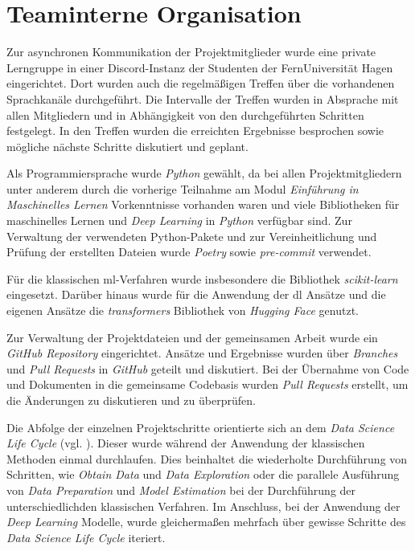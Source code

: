 \section{Teaminterne Organisation}\label{sec:teaminterneorganisation}

Zur asynchronen Kommunikation der Projektmitglieder wurde eine private Lerngruppe in einer Discord-Instanz der Studenten der FernUniversität Hagen eingerichtet.
Dort wurden auch die regelmäßigen Treffen über die vorhandenen Sprachkanäle durchgeführt.
Die Intervalle der Treffen wurden in Absprache mit allen Mitgliedern und in Abhängigkeit von den durchgeführten Schritten festgelegt.
In den Treffen wurden die erreichten Ergebnisse besprochen sowie mögliche nächste Schritte diskutiert und geplant.

Als Programmiersprache wurde \textit{Python} gewählt, da bei allen Projektmitgliedern unter anderem durch die vorherige Teilnahme am Modul \textit{Einführung in Maschinelles Lernen} Vorkenntnisse vorhanden waren und viele Bibliotheken für maschinelles Lernen und \textit{Deep Learning} in \textit{Python} verfügbar sind.
Zur Verwaltung der verwendeten Python-Pakete und zur Vereinheitlichung und Prüfung der erstellten Dateien wurde \textit{Poetry} \cite{poetry2025} sowie \textit{pre-commit}\cite{precommit2025} verwendet.

Für die klassischen \gls{ml}-Verfahren wurde insbesondere die Bibliothek \textit{scikit-learn} eingesetzt.
Darüber hinaus wurde für die Anwendung der \gls{dl} Ansätze und die eigenen Ansätze die \textit{transformers} Bibliothek von \textit{Hugging Face} genutzt.

Zur Verwaltung der Projektdateien und der gemeinsamen Arbeit wurde ein \textit{GitHub Repository} \cite{githubrepo2025} eingerichtet.
Ansätze und Ergebnisse wurden über \textit{Branches} und \textit{Pull Requests} in \textit{GitHub} geteilt und diskutiert.
Bei der Übernahme von Code und Dokumenten in die gemeinsame Codebasis wurden \textit{Pull Requests} erstellt, um die Änderungen zu diskutieren und zu überprüfen.

Die Abfolge der einzelnen Projektschritte orientierte sich an dem \textit{Data Science Life Cycle} (vgl. \cite[Abb. 2]{Stodden2020}).
Dieser wurde während der Anwendung der klassischen Methoden einmal durchlaufen.
Dies beinhaltet die wiederholte Durchführung von Schritten, wie \textit{Obtain Data} und \textit{Data Exploration} oder die parallele Ausführung von \textit{Data Preparation} und \textit{Model Estimation} bei der Durchführung der unterschiedlichden klassischen Verfahren.
Im Anschluss, bei der Anwendung der \textit{Deep Learning} Modelle, wurde gleichermaßen mehrfach über gewisse Schritte des \textit{Data Science Life Cycle} iteriert.
